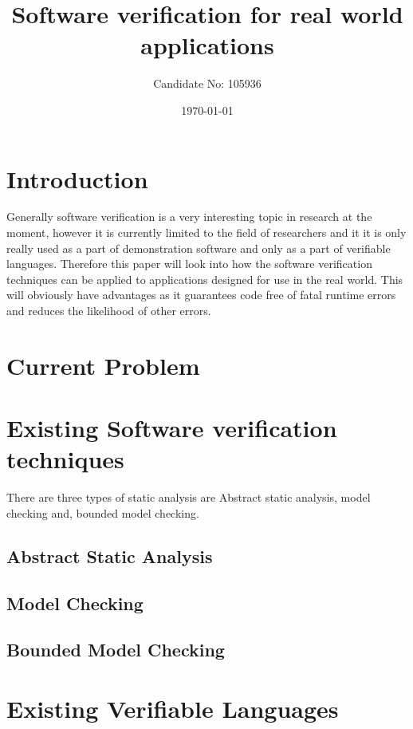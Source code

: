 \documentclass[a4paper,12pt]{scrartcl}
\title{Software verification for real world applications}
\author{Candidate No: 105936}
\date{\today}
\begin{document}
	
	\begin{titlepage}
		\maketitle
	\end{titlepage}
	
	\tableofcontents
	\newpage
	\section{Introduction}
	{
		Generally software verification is a very interesting topic in research at the moment, however it is currently limited to the field of researchers and it it is only really used as a part of demonstration software and only as a part of verifiable languages. Therefore this paper will look into how the software verification techniques can be applied to applications designed for use in the real world. This will obviously have advantages as it guarantees code free of fatal runtime errors and reduces the likelihood of other errors.
	}

	\section{Current Problem}
	{
	}
	
	\section{Existing Software verification techniques}
	{
		There are three types of static analysis are Abstract static analysis, model checking and, bounded model checking.\cite{DSilva2008} 
		\subsection{Abstract Static Analysis}
		
		\subsection{Model Checking}
		
		\subsection{Bounded Model Checking}
	}
	
	\section{Existing Verifiable Languages}
	{
		
	}
\end{document}
